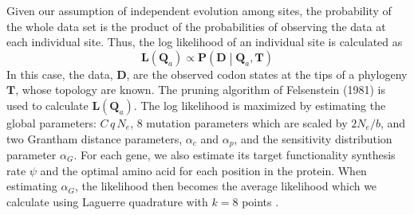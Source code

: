 \documentclass{article}
\newcommand{\Ne}{\ensuremath{{N_e}}\xspace} %
\newcommand{\Pmatrix}{\mathbf{P}\xspace}
\newcommand{\Tmatrix}{\mathbf{T}\xspace}
\newcommand{\Dmatrix}{\mathbf{D}\xspace}
\newcommand{\Lmatrix}{\mathbf{L}\xspace}
\newcommand{\Qmatrix}{\mathbf{Q}\xspace}
\newcommand{\Qmatrixa}{\ensuremath{\Qmatrix_a}\xspace}
\newcommand{\alphac}{\ensuremath{\alpha_c}\xspace}
\newcommand{\alphag}{\ensuremath{\alpha_G}\xspace}
\newcommand{\alphap}{\ensuremath{\alpha_p}\xspace}
\begin{document}
Given our assumption of independent evolution among sites, the probability of the whole data set is the product of the probabilities of observing the data at each individual site. 
Thus, the log likelihood of an individual site is calculated as 
\begin{equation}
\Lmatrix\left(\Qmatrixa\right) \propto \Pmatrix\left(\Dmatrix\middle|\Qmatrixa,\Tmatrix\right)
\end{equation}
In this case, the data, $\Dmatrix$, are the observed codon states at the tips of a phylogeny $\Tmatrix$, whose topology are known. 
The pruning algorithm of Felsenstein (1981) is used to calculate $\Lmatrix(\Qmatrixa)$. 
The log likelihood is maximized by estimating the global parameters: $C \, q \, \Ne$, 8 mutation parameters which are scaled by $2 \Ne/b$, and two Grantham distance parameters, $\alphac$ and $\alphap$, and the sensitivity distribution parameter \alphag.
For each gene, we also estimate its target functionality synthesis rate $\psi$  and the optimal amino acid for each position in the protein. 
When estimating \alphag, the likelihood then becomes the average likelihood which we calculate using Laguerre quadrature with $k = 8$ points  \citep{Yang1994,Felsenstein2001}.





\end{document}
